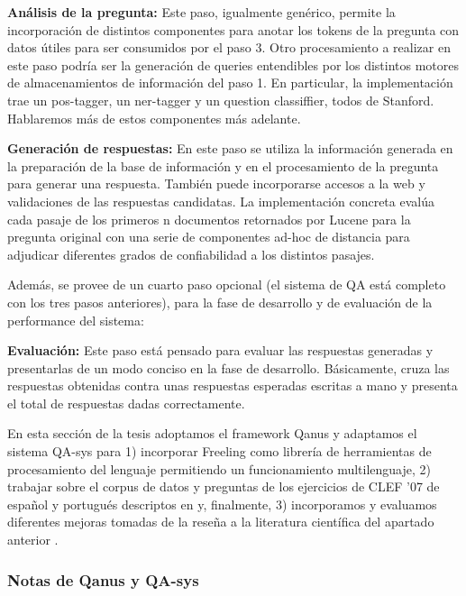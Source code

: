 \textbf{Análisis de la pregunta: } Este paso, igualmente genérico, permite la incorporación de
distintos componentes para anotar los tokens de la pregunta con datos
útiles para ser consumidos por el paso 3. Otro procesamiento a
realizar en este paso podría ser la generación de queries
entendibles por los distintos motores de almacenamientos de
información del paso 1. En particular, la implementación trae un
pos-tagger, un ner-tagger y un question classiffier, todos de Stanford.
Hablaremos más de estos componentes más adelante. \newline

\textbf{Generación de respuestas: } En este paso se utiliza la información generada en la preparación
de la base de información y en el procesamiento de la pregunta para
generar una respuesta. También puede incorporarse accesos a la web y
validaciones de las respuestas candidatas. La implementación concreta
evalúa cada pasaje de los primeros n documentos retornados por Lucene
para la pregunta original con una serie de componentes ad-hoc de
distancia para adjudicar diferentes grados de confiabilidad a los
distintos pasajes. \newline


Además, se provee de un cuarto paso opcional (el sistema de QA está
completo con los tres pasos anteriores), para la fase de desarrollo y
de evaluación de la performance del sistema:\newline


\textbf{Evaluación: }Este paso está pensado para evaluar las respuestas generadas y
presentarlas de un modo conciso en la fase de desarrollo.
Básicamente, cruza las respuestas obtenidas contra unas respuestas
esperadas escritas a mano y presenta el total de respuestas dadas
correctamente.\newline

En esta sección de la tesis adoptamos el framework Qanus y adaptamos el sistema QA-sys para 1) incorporar Freeling como librería de herramientas de procesamiento del lenguaje permitiendo un funcionamiento multilenguaje, 2) trabajar sobre el corpus de datos y preguntas de los ejercicios de CLEF '07 de español y portugués descriptos en  y, finalmente, 3) incorporamos y evaluamos diferentes mejoras tomadas de la reseña a la literatura científica del apartado anterior .

\subsubsection{Notas de Qanus y QA-sys}

